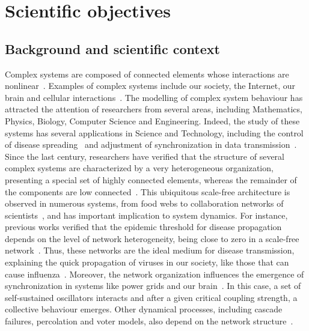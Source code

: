 \section{Scientific objectives}
\label{sec-science}
\subsection{Background and scientific context}
Complex systems are composed of connected elements whose interactions are 
nonlinear~\cite{BarYam97,Mitchell09}. Examples of complex systems include our 
society, the Internet, our brain and cellular interactions~\cite{Mitchell09}. 
The modelling of complex system behaviour has attracted the attention of 
researchers from several areas, including Mathematics, Physics, Biology, 
Computer Science and Engineering. Indeed, the study of these systems has 
several applications in Science and Technology, including the control of 
disease spreading~\cite{Pastor015} and adjustment of synchronization in data 
transmission~\cite{Pikovsky03}. Since the last century, researchers have 
verified that the structure of several complex systems are characterized by a 
very heterogeneous organization, presenting a special set of highly connected 
elements, whereas the remainder of the components are low 
connected~\cite{Barabasi99}. This ubiquitous scale-free architecture is 
observed in numerous systems, from food webs to collaboration networks of 
scientists~\cite{Costa011}, and has important implication to system dynamics. 
For instance, previous works verified that the epidemic threshold for disease 
propagation depends on the level of network heterogeneity, being close to zero 
in a scale-free network~\cite{Pastor015}. Thus, these networks are the ideal 
medium for disease transmission, explaining the quick propagation of viruses in 
our society, like those that can cause influenza~\cite{Keeling08}. Moreover, 
the network organization influences the emergence of synchronization in systems 
like power grids and our brain~\cite{Arenas08}. In this case, a set of 
self-sustained oscillators interacts and after a given critical coupling 
strength, a collective behaviour emerges. Other dynamical processes, including 
cascade failures, percolation and voter models, also depend on the network 
structure~\cite{Barrat08}. 

